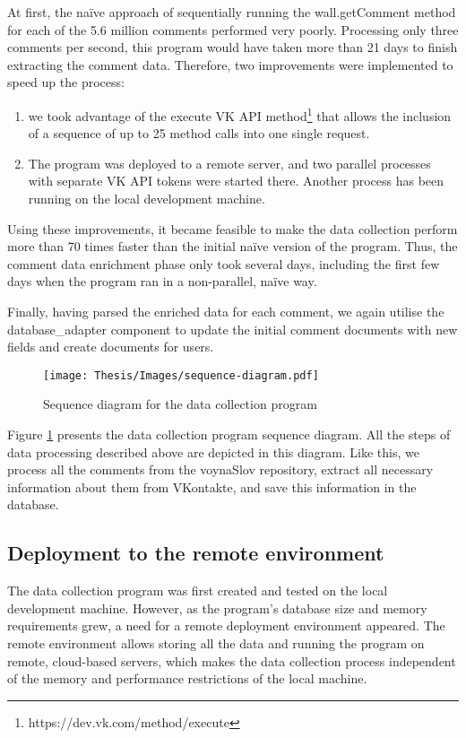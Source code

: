 At first, the naïve approach of sequentially running the wall.getComment method for each of the 5.6 million comments performed very poorly. Processing only three comments per second, this program would have taken more than 21 days to finish extracting the comment data. Therefore, two improvements were implemented to speed up the process:
\begin{enumerate}
    \item we took advantage of the execute VK API method\footnote{https://dev.vk.com/method/execute} that allows the inclusion of a sequence of up to 25 method calls into one single request.
    \item The program was deployed to a remote server, and two parallel processes with separate VK API tokens were started there. Another process has been running on the local development machine.
\end{enumerate}

Using these improvements, it became feasible to make the data collection perform more than 70 times faster than the initial naïve version of the program. Thus, the comment data enrichment phase only took several days, including the first few days when the program ran in a non-parallel, naïve way.

Finally, having parsed the enriched data for each comment, we again utilise the database\_adapter component to update the initial comment documents with new fields and create documents for users.

\begin{figure}
	\centering
	\texttt{[image: Thesis/Images/sequence-diagram.pdf]}
	\caption{Sequence diagram for the data collection program}
	\label{fig:sequence-data-collection}
\end{figure}

Figure \ref{fig:sequence-data-collection} presents the data collection program sequence diagram. All the steps of data processing described above are depicted in this diagram. Like this, we process all the comments from the voynaSlov repository, extract all necessary information about them from VKontakte, and save this information in the database.

\subsection{Deployment to the remote environment}
\label{sec:deployment}
The data collection program was first created and tested on the local development machine. However, as the program's database size and memory requirements grew, a need for a remote deployment environment appeared. The remote environment allows storing all the data and running the program on remote, cloud-based servers, which makes the data collection process independent of the memory and performance restrictions of the local machine.

